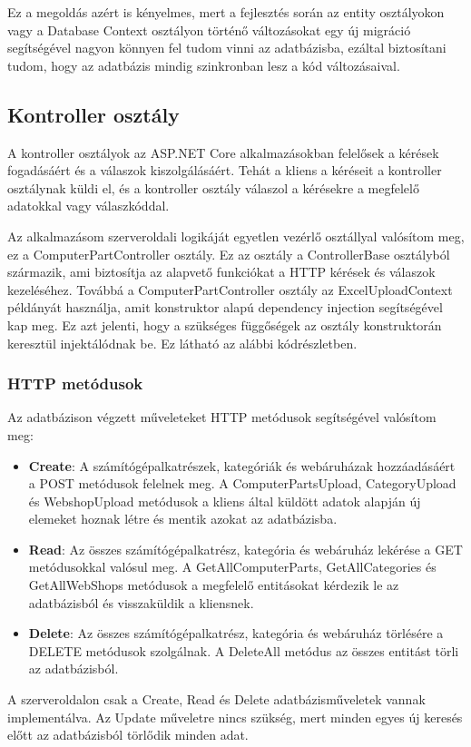 \documentclass[
]{thesis-ekf}
\theoremstyle{definition}
\theoremstyle{remark}
\begin{document}
Ez a megoldás azért is kényelmes, mert a fejlesztés során az entity osztályokon vagy a Database Context osztályon történő változásokat egy új migráció segítségével nagyon könnyen fel tudom vinni az adatbázisba, ezáltal biztosítani tudom, hogy az adatbázis mindig szinkronban lesz a kód változásaival.	
\subsection{Kontroller osztály}
A kontroller osztályok az ASP.NET Core alkalmazásokban felelősek a kérések fogadásáért és a válaszok kiszolgálásáért. Tehát a kliens a kéréseit a kontroller osztálynak küldi el, és a kontroller osztály válaszol a kérésekre a megfelelő adatokkal vagy válaszkóddal.

Az alkalmazásom szerveroldali logikáját egyetlen vezérlő osztállyal valósítom meg, ez a ComputerPartController osztály. Ez az osztály a ControllerBase osztályból származik, ami biztosítja az alapvető funkciókat a HTTP kérések és válaszok kezeléséhez. Továbbá a ComputerPartController osztály az ExcelUploadContext példányát használja, amit konstruktor alapú dependency injection segítségével kap meg. Ez azt jelenti, hogy a szükséges függőségek az osztály konstruktorán keresztül injektálódnak be. Ez látható az alábbi kódrészletben.


\subsubsection{HTTP metódusok}
Az adatbázison végzett műveleteket HTTP metódusok segítségével valósítom meg:
\begin{itemize}
	\item \textbf{Create}: A számítógépalkatrészek, kategóriák és webáruházak hozzáadásáért a POST metódusok felelnek meg. A ComputerPartsUpload, CategoryUpload és WebshopUpload metódusok a kliens által küldött adatok alapján új elemeket hoznak létre és mentik azokat az adatbázisba.

	\item \textbf{Read}: Az összes számítógépalkatrész, kategória és webáruház lekérése a GET metódusokkal valósul meg. A GetAllComputerParts, GetAllCategories és GetAllWebShops metódusok a megfelelő entitásokat kérdezik le az adatbázisból és visszaküldik  a kliensnek.

	\item \textbf{Delete}: Az összes számítógépalkatrész, kategória és webáruház törlésére a DELETE metódusok szolgálnak. A DeleteAll metódus az összes entitást törli az adatbázisból.
\end{itemize}
A szerveroldalon csak a Create, Read és Delete adatbázisműveletek vannak implementálva. Az Update műveletre nincs szükség, mert minden egyes új keresés előtt az adatbázisból törlődik minden adat.
\end{document}
